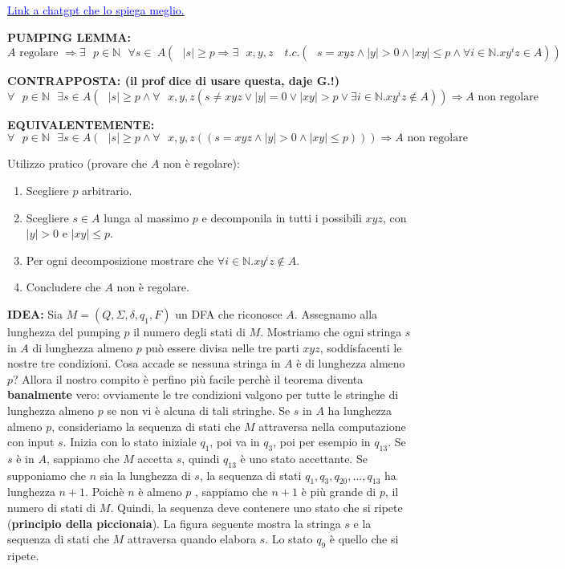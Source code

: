 \documentclass{article}
\begin{document}
\href{https://chatgpt.com/share/6759c242-4ec8-8011-9b41-8664075f8a1a}{\textcolor{blue}{Link a chatgpt che lo spiega meglio.}}

\textbf{PUMPING LEMMA:}
$$
A \text{ regolare }\Rightarrow \exists\text{ }p \in \mathbb{N}\text{ }\forall s\in\ A(\text{ }|s| \geq p \Rightarrow \exists \text{ }x,y,z \quad t.c.(\text{ }s = xyz\wedge |y|>0 \wedge |xy|\leq p \wedge \forall i\in \mathbb{N}.xy^{i}z \in A))
$$
\vspace{1em}

\textbf{CONTRAPPOSTA: (il prof dice di usare questa, daje G.!)}
$$
\forall\text{ }p \in \mathbb{N}\text{ }\exists s\in A(\text{ }|s| \geq p \wedge \forall \text{ }x,y,z (s \neq xyz \vee |y| = 0 \vee |xy| > p \vee \exists i\in \mathbb{N}.xy^{i}z \notin A)) \Rightarrow A \text{ non regolare}
$$
\vspace{1em}

\textbf{EQUIVALENTEMENTE:}
$$
\forall\text{ }p \in \mathbb{N}\text{ }\exists s\in A(\text{ }|s| \geq p \wedge \forall \text{ }x,y,z ((s = xyz \wedge |y| > 0 \wedge |xy| \leq p))) \Rightarrow A \text{ non regolare}
$$
\vspace{1em}

Utilizzo pratico (provare che $A$ non è regolare):
\begin{enumerate}
    \item Scegliere $p$ arbitrario.
    \item Scegliere $s \in A$ lunga al massimo $p$ e decomponila in tutti i possibili $xyz$, con $|y| > 0$ e $|xy| \leq p$.
    \item Per ogni decomposizione mostrare che $\forall i\in \mathbb{N}.xy^{i}z \notin A$.
    \item Concludere che $A$ non è regolare.
\end{enumerate}
\vspace{1em}

\textbf{IDEA:}
Sia $M = (Q,\Sigma,\delta,q_{1},F)$ un DFA che riconosce $A$. Assegnamo alla lunghezza del pumping $p$ il numero degli stati di $M$. Mostriamo che ogni stringa $s$ in $A$ di lunghezza almeno $p$ può essere divisa nelle tre parti $xyz$, soddisfacenti le nostre tre condizioni. Cosa accade se nessuna stringa in $A$ è di lunghezza almeno $p$? Allora il nostro compito è perfino più facile perchè il teorema diventa \textbf{banalmente} vero: ovviamente le tre condizioni valgono per tutte le stringhe di lunghezza almeno $p$ se non vi è alcuna di tali stringhe.
Se $s$ in $A$ ha lunghezza almeno $p$, consideriamo la sequenza di stati che $M$ attraversa nella computazione con input $s$. Inizia con lo stato iniziale $q_{1}$, poi va in $q_{3}$, poi per esempio in $q_{13}$. Se $s$ è in $A$, sappiamo che $M$ accetta $s$, quindi $q_{13}$ è uno stato accettante.
Se supponiamo che $n$ sia la lunghezza di $s$, la sequenza di stati $q_{1},q_{3},q_{20},...,q_{13}$ ha lunghezza $n+1$. Poichè $n$ è almeno $p$ , sappiamo che $n+1$ è più grande di $p$, il numero di stati di $M$. Quindi, la sequenza deve contenere uno stato che si ripete (\textbf{principio della piccionaia}).
La figura seguente mostra la stringa $s$ e la sequenza di stati che $M$ attraversa quando elabora $s$. Lo stato $q_{9}$ è quello che si ripete.
\end{document}
